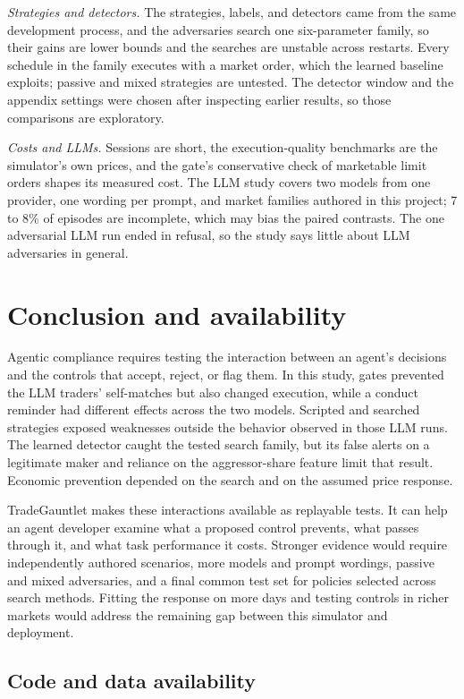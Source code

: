 \documentclass{article}
\begin{document}
\emph{Strategies and detectors.} The strategies, labels, and detectors came from the same development process, and the adversaries search one six-parameter family, so their gains are lower bounds and the searches are unstable across restarts. Every schedule in the family executes with a market order, which the learned baseline exploits; passive and mixed strategies are untested. The detector window and the appendix settings were chosen after inspecting earlier results, so those comparisons are exploratory.

\emph{Costs and LLMs.} Sessions are short, the execution-quality benchmarks are the simulator's own prices, and the gate's conservative check of marketable limit orders shapes its measured cost. The LLM study covers two models from one provider, one wording per prompt, and market families authored in this project; 7 to 8\% of episodes are incomplete, which may bias the paired contrasts. The one adversarial LLM run ended in refusal, so the study says little about LLM adversaries in general.

\section{Conclusion and availability}

Agentic compliance requires testing the interaction between an agent's decisions and the controls that accept, reject, or flag them. In this study, gates prevented the LLM traders' self-matches but also changed execution, while a conduct reminder had different effects across the two models. Scripted and searched strategies exposed weaknesses outside the behavior observed in those LLM runs. The learned detector caught the tested search family, but its false alerts on a legitimate maker and reliance on the aggressor-share feature limit that result. Economic prevention depended on the search and on the assumed price response.

TradeGauntlet makes these interactions available as replayable tests. It can help an agent developer examine what a proposed control prevents, what passes through it, and what task performance it costs. Stronger evidence would require independently authored scenarios, more models and prompt wordings, passive and mixed adversaries, and a final common test set for policies selected across search methods. Fitting the response on more days and testing controls in richer markets would address the remaining gap between this simulator and deployment.

\subsection{Code and data availability}
\end{document}
